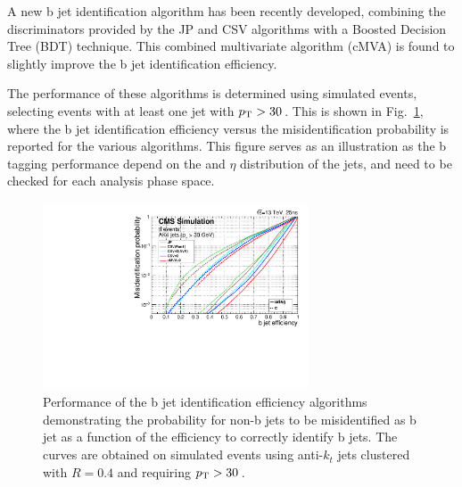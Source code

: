 A new b jet identification algorithm has been recently developed, combining the discriminators provided by the JP and CSV algorithms with a Boosted Decision Tree (BDT) technique. This combined multivariate algorithm (cMVA) is found to slightly improve the b jet identification efficiency.

The performance of these algorithms is determined using simulated \ttbar events, selecting events with at least one jet with $p_\mathrm{T} > 30$\,\GeV. This is shown in Fig.~\ref{fig:btagperf}, where the b jet identification efficiency versus the misidentification probability is reported for the various algorithms. This figure serves as an illustration as the b tagging performance depend on the \pt and $\eta$ distribution of the jets, and need to be checked for each analysis phase space.

\begin{figure}[htb]
\centering
\includegraphics[width=0.7\textwidth]{images/btagperf.pdf}
\caption{Performance of the b jet identification efficiency algorithms demonstrating the probability for non-b jets to be misidentified as b jet as a function of the efficiency to correctly identify b jets. The curves are obtained on simulated \ttbar events using anti-$k_t$ jets clustered with $R=0.4$ and requiring $p_\mathrm{T}>30$\,\GeV.}\label{fig:btagperf}
\end{figure}


